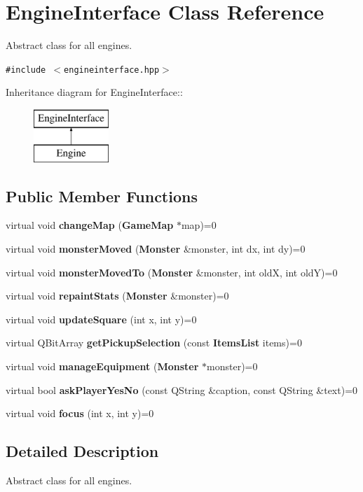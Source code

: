 \section{Engine\-Interface Class Reference}
\label{classEngineInterface}
Abstract class for all engines.  


{\tt \#include $<$engineinterface.hpp$>$}

Inheritance diagram for Engine\-Interface::\begin{figure}[H]
\begin{center}
\leavevmode
\includegraphics[height=2cm]{classEngineInterface}
\end{center}
\end{figure}
\subsection*{Public Member Functions}
\begin{CompactItemize}
\item 
virtual void {\bf change\-Map} ({\bf Game\-Map} $\ast$map)=0
\item 
virtual void {\bf monster\-Moved} ({\bf Monster} \&monster, int dx, int dy)=0
\item 
virtual void {\bf monster\-Moved\-To} ({\bf Monster} \&monster, int old\-X, int old\-Y)=0
\item 
virtual void {\bf repaint\-Stats} ({\bf Monster} \&monster)=0
\item 
virtual void {\bf update\-Square} (int x, int y)=0
\item 
virtual QBit\-Array {\bf get\-Pickup\-Selection} (const {\bf Items\-List} items)=0
\item 
virtual void {\bf manage\-Equipment} ({\bf Monster} $\ast$monster)=0
\item 
virtual bool {\bf ask\-Player\-Yes\-No} (const QString \&caption, const QString \&text)=0
\item 
virtual void {\bf focus} (int x, int y)=0
\end{CompactItemize}


\subsection{Detailed Description}
Abstract class for all engines. 



